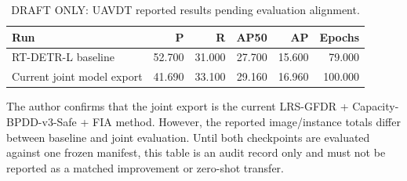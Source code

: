 \begin{table}[t]
\centering
\small
\setlength{\tabcolsep}{4pt}
\caption{DRAFT ONLY: UAVDT reported results pending evaluation alignment.}
\label{tab:selected-4}
\begin{tabular}{lrrrrr}
\toprule
Run & P & R & AP50 & AP & Epochs \\
\midrule
RT-DETR-L baseline & 52.700 & 31.000 & 27.700 & 15.600 & 79.000 \\
Current joint model export & 41.690 & 33.100 & 29.160 & 16.960 & 100.000 \\
\bottomrule
\end{tabular}
\par\smallskip
\begin{minipage}{0.97\textwidth}\footnotesize The author confirms that the joint export is the current LRS-GFDR + Capacity-BPDD-v3-Safe + FIA method. However, the reported image/instance totals differ between baseline and joint evaluation. Until both checkpoints are evaluated against one frozen manifest, this table is an audit record only and must not be reported as a matched improvement or zero-shot transfer.\end{minipage}
\par\medskip
\end{table}
